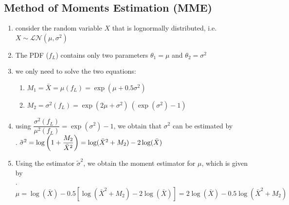 \subsection{Method of Moments Estimation (MME)}

\begin{enumerate}
    \item consider the random variable $X$ that is lognormally distributed, i.e. $X \sim \mathcal{LN} (\mu ,\sigma ^{2})$
    \hfill \cite{statistics/book/Statistics-for-Data-Scientists/Maurits-Kaptein}

    \item The PDF ($f_L$) contains only two parameters $\theta_1 = \mu$ and $\theta_2 = \sigma^ 2 $
    \hfill \cite{statistics/book/Statistics-for-Data-Scientists/Maurits-Kaptein}

    \item we only need to solve the two equations:
    \hfill \cite{statistics/book/Statistics-for-Data-Scientists/Maurits-Kaptein}
    \begin{enumerate}
        \item $M_1 = \bar{X} = \mu  ( f_ L ) = \exp (\mu  + 0.5 \sigma  ^2)$
        \hfill \cite{statistics/book/Statistics-for-Data-Scientists/Maurits-Kaptein}

        \item $M_2 = \sigma  ^2 ( f _L ) = \exp (2\mu  + \sigma ^ 2)\ (\exp (\sigma  ^2) - 1)$
        \hfill \cite{statistics/book/Statistics-for-Data-Scientists/Maurits-Kaptein}
    \end{enumerate}

    \item using $\dfrac{\sigma ^2 ( f_ L )}{\mu^2 ( f_ L )} = \exp (\sigma^ 2) - 1$, we obtain that $\sigma^ 2$ can be estimated by
    \hfill \cite{statistics/book/Statistics-for-Data-Scientists/Maurits-Kaptein}
    \\
    .\hfill
    $
        \tilde{\sigma}^ 2
        = \log \left( 1 + \dfrac{M_2} {\bar{X}^2} \right)
        = \log ( \bar{X}^2 + M_2 ) - 2 \log ( \bar{X} )
    $
    \hfill \cite{statistics/book/Statistics-for-Data-Scientists/Maurits-Kaptein}

    \item Using the estimator $\tilde{\sigma} ^2$, we obtain the moment estimator for $\mu$, which is given by
    \hfill \cite{statistics/book/Statistics-for-Data-Scientists/Maurits-Kaptein}
    \\[0.2cm]
    .\hfill
    $
        \mu
        = \log ( \bar{X}) - 0.5 [\log ( \bar{X}^2 + M_2 ) - 2 \log ( \bar{X} )]
        = 2 \log ( \bar{X} ) - 0.5 \log ( \bar{X}^2 + M_2 )
    $
    \hfill \cite{statistics/book/Statistics-for-Data-Scientists/Maurits-Kaptein}


\end{enumerate}
